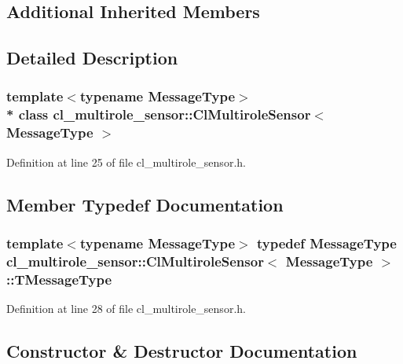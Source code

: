 \subsection*{Additional Inherited Members}


\subsection{Detailed Description}
\subsubsection*{template$<$typename Message\+Type$>$\\*
class cl\+\_\+multirole\+\_\+sensor\+::\+Cl\+Multirole\+Sensor$<$ Message\+Type $>$}



Definition at line 25 of file cl\+\_\+multirole\+\_\+sensor.\+h.



\subsection{Member Typedef Documentation}
\subsubsection[{\texorpdfstring{T\+Message\+Type}{TMessageType}}]{\setlength{\rightskip}{0pt plus 5cm}template$<$typename Message\+Type$>$ typedef Message\+Type {\bf cl\+\_\+multirole\+\_\+sensor\+::\+Cl\+Multirole\+Sensor}$<$ Message\+Type $>$\+::{\bf T\+Message\+Type}}\hypertarget{classcl__multirole__sensor_1_1ClMultiroleSensor_a76f2c1e5c54556bacdaf0aaf809972da}{}\label{classcl__multirole__sensor_1_1ClMultiroleSensor_a76f2c1e5c54556bacdaf0aaf809972da}


Definition at line 28 of file cl\+\_\+multirole\+\_\+sensor.\+h.



\subsection{Constructor \& Destructor Documentation}
